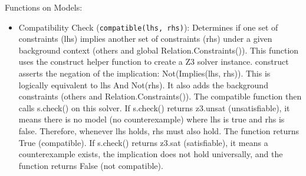 Functions on Models:
\begin{itemize}
  \item Compatibility Check (\texttt{compatible(lhs, rhs)}):
    Determines if one set of
    constraints (lhs) implies another set of constraints (rhs) under a given
    background context (others and global
    Relation.Constraints()). This function
    uses the construct helper function to create a Z3 solver
    instance. construct
    asserts the negation of the implication: Not(Implies(lhs, rhs)). This is
    logically equivalent to lhs And Not(rhs). It also adds the background
    constraints (others and Relation.Constraints()). The
    compatible function then
    calls s.check() on this solver. If s.check() returns z3.unsat
    (unsatisfiable),
    it means there is no model (no counterexample) where lhs is
    true and rhs is
    false. Therefore, whenever lhs holds, rhs must also hold. The
    function returns
    True (compatible). If s.check() returns z3.sat (satisfiable), it means a
    counterexample exists, the implication does not hold
    universally, and the
    function returns False (not compatible).


\end{itemize}
